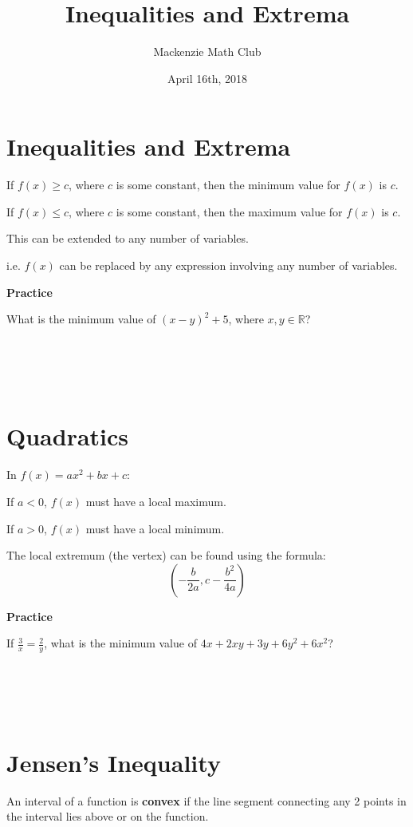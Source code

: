 

\title{Inequalities and Extrema}
\author{Mackenzie Math Club}
\date{April 16th, 2018}




\section{Inequalities and Extrema}
If $f(x) \geq c$, where $c$ is some constant, then the minimum value for $f(x)$ is $c$.

If $f(x) \leq c$, where $c$ is some constant, then the maximum value for $f(x)$ is $c$.

This can be extended to any number of variables.

i.e. $f(x)$ can be replaced by any expression involving any number of variables.

\textbf{Practice}

What is the minimum value of $(x - y)^2 + 5$, where $x, y \in \mathbb{R}$?
\\\\\\\\\\

\section{Quadratics}
In $f(x) = ax^2 + bx + c$:

If $a < 0$, $f(x)$ must have a local maximum.

If $a > 0$, $f(x)$ must have a local minimum.

The local extremum (the vertex) can be found using the formula:
\[\left( -\frac{b}{2a}, c - \frac{b^2}{4a} \right) \]

\textbf{Practice}

If $\frac{3}{x} = \frac{2}{y}$, what is the minimum value of $4x + 2xy + 3y + 6y^2 + 6x^2$?
\\\\\\\\\\
\newpage

\section{Jensen's Inequality}
An interval of a function is \textbf{convex} if the line segment connecting any 2 points in the interval lies above or on the function.

